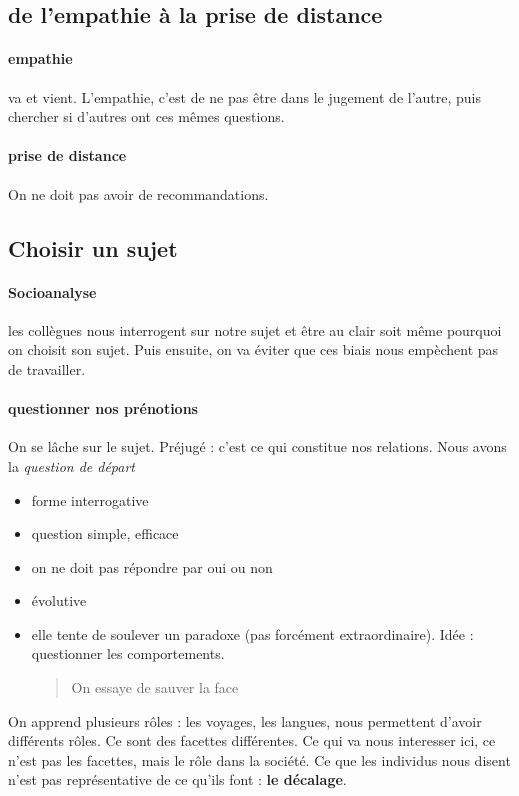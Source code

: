 \subsection{de l'empathie à la prise de distance}
\paragraph{empathie} va et vient. L'empathie, c'est de ne pas être dans le jugement de l'autre, puis chercher si d'autres ont ces mêmes questions.

\paragraph{prise de distance} On ne doit pas avoir de recommandations.


\subsection{Choisir un sujet}

\paragraph{Socioanalyse} les collègues nous interrogent sur notre sujet et être au clair soit même pourquoi on choisit son sujet. Puis ensuite, on va éviter que ces biais nous empèchent pas de travailler.

\paragraph{questionner nos prénotions} On se lâche sur le sujet. Préjugé : c'est ce qui constitue nos relations. Nous avons la \textit{question de départ}
\begin{itemize}
\item forme interrogative
\item question simple, efficace
\item on ne doit pas répondre par oui ou non
\item évolutive
\item elle tente de soulever un paradoxe (pas forcément extraordinaire). Idée : questionner les comportements. 

\begin{quote}
On essaye de sauver la face 
\end{quote}


\end{itemize}

On apprend plusieurs rôles : les voyages, les langues, nous permettent d'avoir différents rôles. Ce sont des facettes différentes. Ce qui va nous interesser ici, ce n'est pas les facettes, mais le rôle dans la société. Ce que les individus nous disent n'est pas représentative de ce qu'ils font : \textbf{le décalage}.


